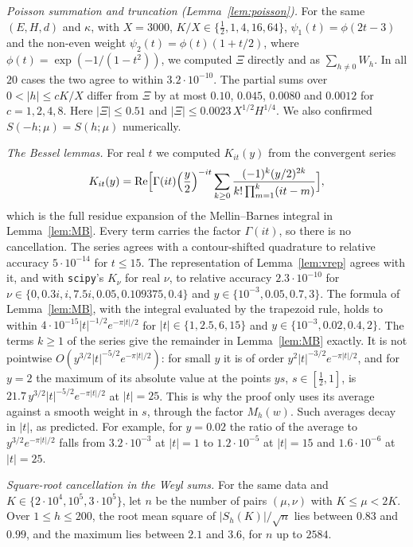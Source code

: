 \documentclass[11pt]{amsart}
\theoremstyle{remark}
\theoremstyle{definition}
\numberwithin{equation}{section}
\begin{document}
\emph{Poisson summation and truncation (Lemma~\ref{lem:poisson}).} For the same $(E,H,d)$ and $\kappa$, with $X=3000$, $K/X\in\{\frac12,1,4,16,64\}$, $\psi_1(t)=\phi(2t-3)$ and the non-even weight $\psi_2(t)=\phi(t)(1+t/2)$, where $\phi(t)=\exp(-1/(1-t^2))$, we computed $\Xi$ directly and as $\sum_{h\ne0}W_h$. In all $20$ cases the two agree to within $3.2\cdot10^{-10}$. The partial sums over $0<|h|\le cK/X$ differ from $\Xi$ by at most $0.10$, $0.045$, $0.0080$ and $0.0012$ for $c=1,2,4,8$. Here $|\Xi|\le0.51$ and $|\Xi|\le0.0023\,X^{1/2}H^{1/4}$. We also confirmed $S(-h;\mu)=S(h;\mu)$ numerically.

\emph{The Bessel lemmas.} For real $t$ we computed $K_{it}(y)$ from the convergent series
\[
K_{it}(y)=\operatorname{Re}\Bigl[\Gamma(it)\Bigl(\frac y2\Bigr)^{-it}\sum_{k\ge0}\frac{(-1)^k(y/2)^{2k}}{k!\prod_{m=1}^k(it-m)}\Bigr],
\]
which is the full residue expansion of the Mellin--Barnes integral in Lemma~\ref{lem:MB}. Every term carries the factor $\Gamma(it)$, so there is no cancellation. The series agrees with a contour-shifted quadrature to relative accuracy $5\cdot10^{-14}$ for $t\le15$. The representation of Lemma~\ref{lem:vrep} agrees with it, and with \texttt{scipy}'s $K_\nu$ for real $\nu$, to relative accuracy $2.3\cdot10^{-10}$ for $\nu\in\{0,0.3i,i,7.5i,0.05,0.109375,0.4\}$ and $y\in\{10^{-3},0.05,0.7,3\}$. The formula of Lemma~\ref{lem:MB}, with the integral evaluated by the trapezoid rule, holds to within $4\cdot10^{-15}|t|^{-1/2}e^{-\pi|t|/2}$ for $|t|\in\{1,2.5,6,15\}$ and $y\in\{10^{-3},0.02,0.4,2\}$. The terms $k\ge1$ of the series give the remainder in Lemma~\ref{lem:MB} exactly. It is not pointwise $O(y^{3/2}|t|^{-5/2}e^{-\pi|t|/2})$: for small $y$ it is of order $y^2|t|^{-3/2}e^{-\pi|t|/2}$, and for $y=2$ the maximum of its absolute value at the points $ys$, $s\in[\frac12,1]$, is $21.7\,y^{3/2}|t|^{-5/2}e^{-\pi|t|/2}$ at $|t|=25$. This is why the proof only uses its average against a smooth weight in $s$, through the factor $M_h(w)$. Such averages decay in $|t|$, as predicted. For example, for $y=0.02$ the ratio of the average to $y^{3/2}e^{-\pi|t|/2}$ falls from $3.2\cdot10^{-3}$ at $|t|=1$ to $1.2\cdot10^{-5}$ at $|t|=15$ and $1.6\cdot10^{-6}$ at $|t|=25$.

\emph{Square-root cancellation in the Weyl sums.} For the same data and $K\in\{2\cdot10^4,10^5,3\cdot10^5\}$, let $n$ be the number of pairs $(\mu,\nu)$ with $K\le\mu<2K$. Over $1\le h\le200$, the root mean square of $|S_h(K)|/\sqrt n$ lies between $0.83$ and $0.99$, and the maximum lies between $2.1$ and $3.6$, for $n$ up to $2584$.
\end{document}
